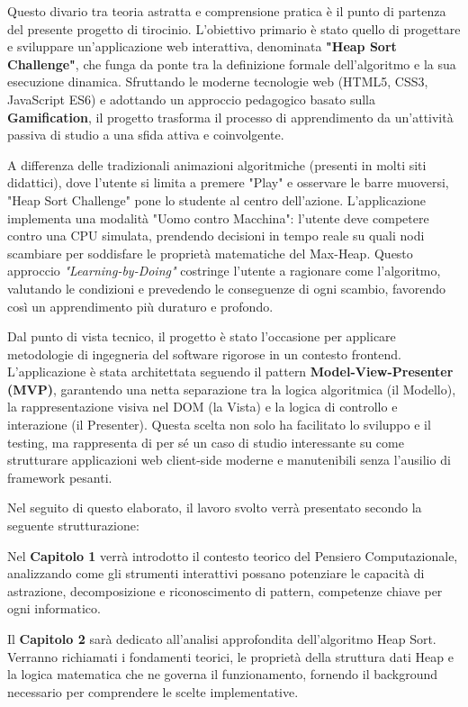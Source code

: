 \documentclass[openany]{theme/uniprthesis}
\begin{document}
Questo divario tra teoria astratta e comprensione pratica è il punto di partenza del presente progetto di tirocinio. L'obiettivo primario è stato quello di progettare e sviluppare un'applicazione web interattiva, denominata \textbf{"Heap Sort Challenge"}, che funga da ponte tra la definizione formale dell'algoritmo e la sua esecuzione dinamica. Sfruttando le moderne tecnologie web (HTML5, CSS3, JavaScript ES6) e adottando un approccio pedagogico basato sulla \textbf{Gamification}, il progetto trasforma il processo di apprendimento da un'attività passiva di studio a una sfida attiva e coinvolgente.

A differenza delle tradizionali animazioni algoritmiche (presenti in molti siti didattici), dove l'utente si limita a premere "Play" e osservare le barre muoversi, "Heap Sort Challenge" pone lo studente al centro dell'azione. L'applicazione implementa una modalità "Uomo contro Macchina": l'utente deve competere contro una CPU simulata, prendendo decisioni in tempo reale su quali nodi scambiare per soddisfare le proprietà matematiche del Max-Heap. Questo approccio \textit{"Learning-by-Doing"} costringe l'utente a ragionare come l'algoritmo, valutando le condizioni e prevedendo le conseguenze di ogni scambio, favorendo così un apprendimento più duraturo e profondo.

Dal punto di vista tecnico, il progetto è stato l'occasione per applicare metodologie di ingegneria del software rigorose in un contesto frontend. L'applicazione è stata architettata seguendo il pattern \textbf{Model-View-Presenter (MVP)}, garantendo una netta separazione tra la logica algoritmica (il Modello), la rappresentazione visiva nel DOM (la Vista) e la logica di controllo e interazione (il Presenter). Questa scelta non solo ha facilitato lo sviluppo e il testing, ma rappresenta di per sé un caso di studio interessante su come strutturare applicazioni web client-side moderne e manutenibili senza l'ausilio di framework pesanti.

Nel seguito di questo elaborato, il lavoro svolto verrà presentato secondo la seguente strutturazione:

Nel \textbf{Capitolo 1} verrà introdotto il contesto teorico del Pensiero Computazionale, analizzando come gli strumenti interattivi possano potenziare le capacità di astrazione, decomposizione e riconoscimento di pattern, competenze chiave per ogni informatico.

Il \textbf{Capitolo 2} sarà dedicato all'analisi approfondita dell'algoritmo Heap Sort. Verranno richiamati i fondamenti teorici, le proprietà della struttura dati Heap e la logica matematica che ne governa il funzionamento, fornendo il background necessario per comprendere le scelte implementative.
\end{document}

